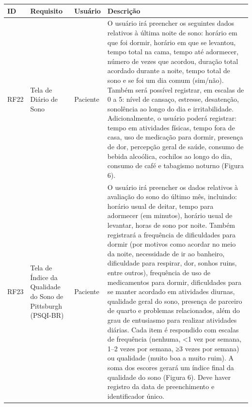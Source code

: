 \href{}{}\documentclass[12pt,portuguese,oneside]{article}
\begin{document}
\begin{table}[H]
\centering
{}
\begin{tabularx}{\textwidth}{|>{\raggedright\arraybackslash}p{1cm}|>{\raggedright\arraybackslash}p{3cm}|>{\raggedright\arraybackslash}p{2cm}|>{\raggedright\arraybackslash}X|}
\hline
\rowcolor{gray!20}
\textbf{ID} & \textbf{Requisito} & \textbf{Usuário} & \textbf{Descrição}\\
\hline
RF22 & Tela de Diário de Sono & Paciente & O usuário irá preencher os seguintes dados relativos à última noite de sono: horário em que foi dormir, horário em que se levantou, tempo total na cama, tempo até adormecer, número de vezes que acordou, duração total acordado durante a noite, tempo total de sono e se foi um dia comum (sim/não). Também será possível registrar, em escalas de 0 a 5: nível de cansaço, estresse, desatenção, sonolência ao longo do dia e irritabilidade. Adicionalmente, o usuário poderá registrar: tempo em atividades físicas, tempo fora de casa, uso de medicação para dormir, presença de dor, percepção geral de saúde, consumo de bebida alcoólica, cochilos ao longo do dia, consumo de café e tabagismo noturno (Figura 6).\\
\hline
RF23 & Tela de Índice da Qualidade do Sono de Pittsburgh (PSQI-BR) & Paciente &
O usuário irá preencher os dados relativos à avaliação do sono do último mês, incluindo: horário usual de deitar, tempo para adormecer (em minutos), horário usual de levantar, horas de sono por noite. Também registrará a frequência de dificuldades para dormir (por motivos como acordar no meio da noite, necessidade de ir ao banheiro, dificuldade para respirar, dor, sonhos ruins, entre outros), frequência de uso de medicamentos para dormir, dificuldades para se manter acordado em atividades diurnas, qualidade geral do sono, presença de parceiro de quarto e problemas relacionados, além do grau de entusiasmo para realizar atividades diárias. Cada item é respondido com escalas de frequência (nenhuma, <1 vez por semana, 1–2 vezes por semana, ≥3 vezes por semana) ou qualidade (muito boa a muito ruim). A soma dos escores gerará um índice final da qualidade do sono (Figura 6). Deve haver registro da data de preenchimento e identificador único.\\
\hline
\end{tabularx}
\end{table}

\newpage
\end{document}
